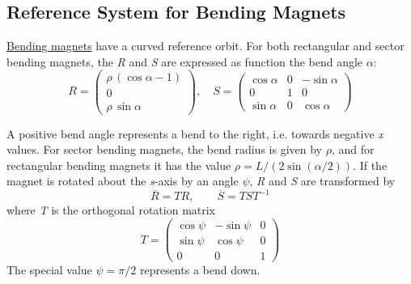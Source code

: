 \subsection{Reference System for Bending Magnets}
\label{subsec:local_rbend}
\hyperref[sec:bend]{Bending magnets} have a curved reference orbit. 
For both rectangular and sector bending magnets, the {\it R} and
{\it S} are expressed as function the bend angle $\alpha$: 
\begin{equation}
R =
 \begin{pmatrix}
  \rho\,(\cos \alpha - 1) \\
  0 \\
  \rho\,\sin \alpha
 \end{pmatrix}
, \quad
S =
 \begin{pmatrix}
  \cos \alpha & 0 &  -\sin \alpha \\
  0 & 1 &  0 \\
  \sin \alpha & 0 &  \cos \alpha
 \end{pmatrix}
\end{equation}
 
A positive bend angle represents a bend to the right, i.e. towards
negative {\it x} values. 
For sector bending magnets, the bend radius is given by $\rho$, and for
rectangular bending magnets it has the value $\rho = L / (2 \sin(\alpha/2))$. 
If the magnet is rotated about the {\it s}-axis by an angle $\psi$,
{\it R} and {\it S} are transformed by  
\begin{equation}
   \overline{R}=TR,
   \qquad
   \overline{S}=TST^{-1}
\end{equation}
where {\it T} is the orthogonal rotation matrix 
\begin{equation}
T =
 \begin{pmatrix}
  \cos \psi &  -\sin \psi & 0 \\
  \sin \psi &  \cos \psi  & 0 \\
  0	    &	0	  & 1 
 \end{pmatrix}
\end{equation}
The special value $\psi = \pi/2$ represents a bend down.  



